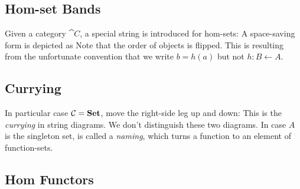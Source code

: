 \subsection{Hom-set Bands}
Given a category $\cat{C}$, a special string is introduced for hom-sets:
A space-saving form is depicted as
Note that the order of objects is flipped. %
This is resulting from the unfortunate convention that we write $b = h(a)$ but not $h : B \leftarrow A$.


\subsection{Currying}

In particular case $\mathcal{C} = \boldsymbol{\mathrm{Set}}$, move the right-side leg up and down:
This is the \textit{currying} in string diagrams. %
We don't distinguish these two diagrams. In case $A$ is the singleton set,
is called a \textit{naming}, which turns a function to an element of function-sets.


\subsection{Hom Functors}

